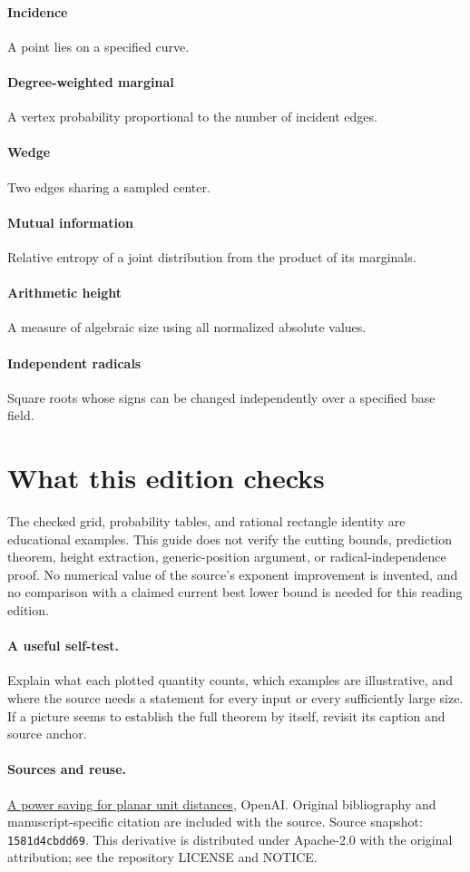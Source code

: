 \documentclass[11pt]{article}
\begin{document}
\paragraph{Incidence}A point lies on a specified curve.
\paragraph{Degree-weighted marginal}A vertex probability proportional to the number of incident edges.
\paragraph{Wedge}Two edges sharing a sampled center.
\paragraph{Mutual information}Relative entropy of a joint distribution from the product of its marginals.
\paragraph{Arithmetic height}A measure of algebraic size using all normalized absolute values.
\paragraph{Independent radicals}Square roots whose signs can be changed independently over a specified base field.
\section*{What this edition checks}The checked grid, probability tables, and rational rectangle identity are educational examples. This guide does not verify the cutting bounds, prediction theorem, height extraction, generic-position argument, or radical-independence proof. No numerical value of the source's exponent improvement is invented, and no comparison with a claimed current best lower bound is needed for this reading edition.
\paragraph{A useful self-test.} Explain what each plotted quantity counts, which examples are illustrative, and where the source needs a statement for every input or every sufficiently large size. If a picture seems to establish the full theorem by itself, revisit its caption and source anchor.\paragraph{Sources and reuse.}\href{https://github.com/openai/math/tree/1581d4cbdd69a0faf34b2089614fe2a814316a6a/preprints/A-power-saving-for-planar-unit-distances-September-23-2026}{A power saving for planar unit distances}, OpenAI. Original bibliography and manuscript-specific citation are included with the source. Source snapshot: \texttt{1581d4cbdd69}. This derivative is distributed under Apache-2.0 with the original attribution; see the repository LICENSE and NOTICE.
\end{document}
